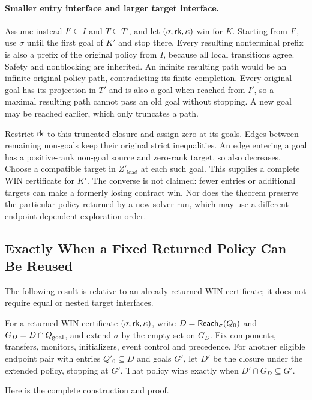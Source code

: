 \paragraph{Smaller entry interface and larger target interface.}
Assume instead $I'\subseteq I$ and $T\subseteq T'$, and let $(\sigma,\mathsf{rk},\kappa)$ win for $K$. Starting from $I'$, use $\sigma$ until the first goal of $K'$ and stop there. Every resulting nonterminal prefix is also a prefix of the original policy from $I$, because all local transitions agree. Safety and nonblocking are inherited. An infinite resulting path would be an infinite original-policy path, contradicting its finite completion. Every original goal has its projection in $T'$ and is also a goal when reached from $I'$, so a maximal resulting path cannot pass an old goal without stopping. A new goal may be reached earlier, which only truncates a path.

Restrict $\mathsf{rk}$ to this truncated closure and assign zero at its goals. Edges between remaining non-goals keep their original strict inequalities. An edge entering a goal has a positive-rank non-goal source and zero-rank target, so also decreases. Choose a compatible target in $Z'_{\mathrm{load}}$ at each such goal. This supplies a complete WIN certificate for $K'$. The converse is not claimed: fewer entries or additional targets can make a formerly losing contract win. Nor does the theorem preserve the particular policy returned by a new solver run, which may use a different endpoint-dependent exploration order.

\subsection{Exactly When a Fixed Returned Policy Can Be Reused}
\label{ta:certificate-interface}
The following result is relative to an already returned WIN certificate; it does not require equal or nested target interfaces.
\begin{theorem}\label{thm:endpoint-interface}\label{prop:certificate-interface}
For a returned WIN certificate $(\sigma,\mathsf{rk},\kappa)$, write $D=\mathsf{Reach}_\sigma(Q_0)$ and $G_D=D\cap Q_{\mathrm{goal}}$, and extend $\sigma$ by the empty set on $G_D$. Fix components, transfers, monitors, initializers, event control and precedence. For another eligible endpoint pair with entries $Q'_0\subseteq D$ and goals $G'$, let $D'$ be the closure under the extended policy, stopping at $G'$. That policy wins exactly when $D'\cap G_D\subseteq G'$.
\end{theorem}
Here is the complete construction and proof.

